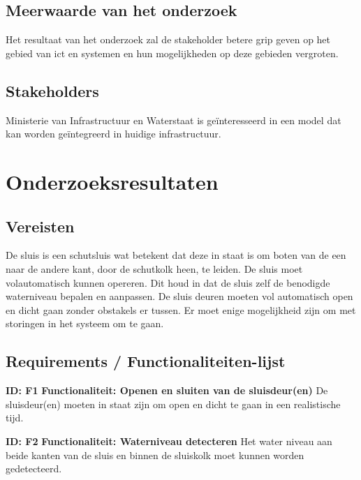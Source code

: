 \documentclass{article}
\begin{document}
\subsection{Meerwaarde van het onderzoek}
Het resultaat van het onderzoek zal de stakeholder betere grip geven op het gebied van ict en systemen en hun mogelijkheden op deze gebieden vergroten. 

\subsection{Stakeholders}
Ministerie van Infrastructuur en Waterstaat is geïnteresseerd in een model dat kan worden geïntegreerd in huidige infrastructuur.



\section{Onderzoeksresultaten}

\subsection{Vereisten}

De sluis is een schutsluis wat betekent dat deze in staat is om boten van de een naar de andere kant, door de schutkolk heen, te leiden. De sluis moet volautomatisch kunnen opereren. Dit houd in dat de sluis zelf de benodigde waterniveau bepalen en aanpassen. De sluis deuren moeten vol automatisch open en dicht gaan zonder obstakels er tussen. Er moet enige mogelijkheid zijn om met storingen in het systeem om te gaan.


\subsection{Requirements / Functionaliteiten-lijst}\label{sec:FuncList}
\textbf{ID: F1} \newline
\textbf{Functionaliteit: Openen en sluiten van de sluisdeur(en)} \newline
De sluisdeur(en) moeten in staat zijn om open en dicht te gaan in een realistische tijd. \newline

\textbf{ID: F2} \newline
\textbf{Functionaliteit: Waterniveau detecteren} \newline
Het water niveau aan beide kanten van de sluis en binnen de sluiskolk moet kunnen worden gedetecteerd. \newline
\end{document}
